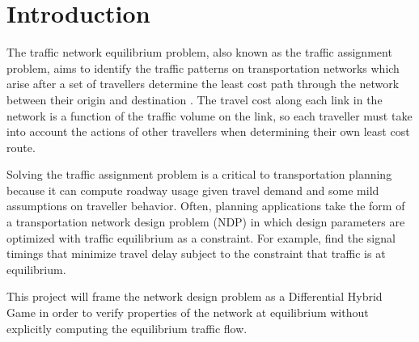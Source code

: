 \section{Introduction}

The traffic network equilibrium problem, also known as the traffic assignment problem, aims to identify the traffic patterns on transportation networks which arise after a set of travellers determine the least cost path through the network between their origin and destination \citep{nagurney2009netecon}.
The travel cost along each link in the network is a function of the traffic volume on the link, so each traveller must take into account the actions of other travellers when determining their own least cost route.

Solving the traffic assignment problem is a critical to transportation planning because it can compute roadway usage given travel demand and some mild assumptions on traveller behavior.
Often, planning applications take the form of a transportation network design problem (NDP) in which design parameters are optimized with traffic equilibrium as a constraint.
For example, \citet{sheffi1983optimal} find the signal timings that minimize travel delay subject to the constraint that traffic is at equilibrium.

This project will frame the network design problem as a Differential Hybrid Game \citep{DBLP:journals/tocl/Platzer17} in order to verify properties of the network at equilibrium without explicitly computing the equilibrium traffic flow.
